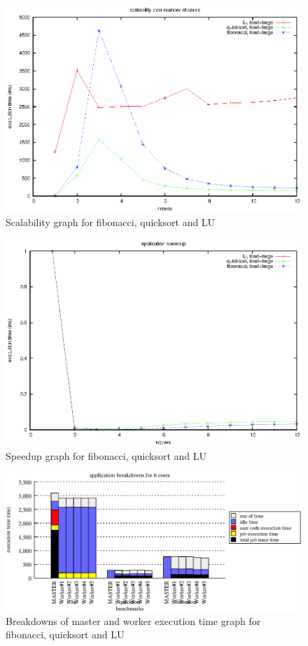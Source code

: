 \begin{figure}[!ht]
\includegraphics[width=\columnwidth]{figures/apps_scalability}
\caption{Scalability graph for fibonacci, quicksort and LU}
\label{fig:apps_scalability}
\end{figure}

\begin{figure}[!ht]
\includegraphics[width=\columnwidth]{figures/apps_speedup}
\caption{Speedup graph for fibonacci, quicksort and LU}
\label{fig:apps_speedup}
\end{figure}

\begin{figure}[!ht]
\includegraphics[width=\columnwidth]{figures/app_breakdowns_6cores}
\caption{Breakdowns of master and worker execution time graph for fibonacci, quicksort and LU}
\label{fig:app_breakdowns_6cores}
\end{figure}

